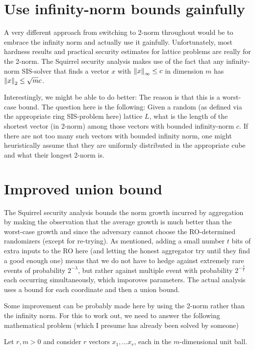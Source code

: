 \documentclass{article}
\begin{document}
\section{Use infinity-norm bounds gainfully}

A very different approach from switching to 2-norm throughout would be to embrace the infinity norm and actually use it gainfully. Unfortunately, most hardness results and practical security estimates for lattice problems are really for the 2-norm.
The Squirrel security analysis makes use of the fact that any infinity-norm SIS-solver that finds a vector $x$ with ${\lVert{x}\rVert}_{\infty} \leq c$ in dimension $m$ has ${\lVert{x}\rVert}_2 \leq \sqrt{m} c$.

Interestingly, we might be able to do better: The reason is that this is a worst-case bound. The question here is the following: Given a random (as defined via the appropriate ring SIS-problem here) lattice $L$, what is the length of the shortest vector (in 2-norm) among those vectors with bounded infinity-norm $c$.
If there are not too many such vectors with bounded infinity norm, one might heuristically assume that they are uniformly distributed in the appropriate cube and what their longest 2-norm is.

\section{Improved union bound}

The Squirrel security analysis bounds the norm growth incurred by aggregation by making the observation that the average growth is much better than the worst-case growth and since the adversary cannot choose the RO-determined randomizers (except for re-trying). As mentioned, adding a small number $t$ bits of extra inputs to the RO here (and letting the honest aggregator try until they find a good enough one) means that we do not have to hedge against extremely rare events of probability $2^{-\lambda}$, but rather against multiple event with probability $2^{-\frac{\lambda}{t}}$ each occurring simultaneously, which imporoves parameters.
The actual analysis uses a bound for each coordinate and then a union bound.

Some improvement can be probably made here by using the 2-norm rather than the infinity norm. For this to work out, we need to answer the following mathematical problem (which I presume has already been solved by someone)

Let $r, m >0$ and consider $r$ vectors $x_1,\ldots x_r$, each in the $m$-dimensional unit ball.
\end{document}
